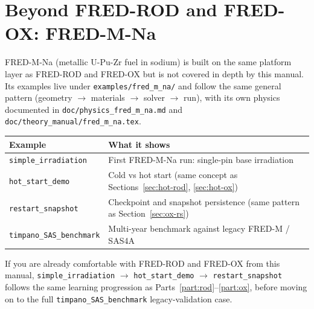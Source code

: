 \documentclass[11pt,a4paper]{article}
\begin{document}
\section{Beyond FRED-ROD and FRED-OX: FRED-M-Na}
\label{sec:mna-pointer}

FRED-M-Na (metallic U-Pu-Zr fuel in sodium) is built on the same platform
layer as FRED-ROD and FRED-OX but is not covered in depth by this manual.
Its examples live under \texttt{examples/fred\_m\_na/} and follow the same
general pattern (geometry $\to$ materials $\to$ solver $\to$ run), with its
own physics documented in \texttt{doc/physics\_fred\_m\_na.md} and
\texttt{doc/theory\_manual/fred\_m\_na.tex}.

\begin{center}
\begin{tabular}{ll}
\toprule
Example & What it shows \\
\midrule
\texttt{simple\_irradiation}         & First FRED-M-Na run: single-pin base irradiation \\
\texttt{hot\_start\_demo}            & Cold vs hot start (same concept as Sections~\ref{sec:hot-rod}, \ref{sec:hot-ox}) \\
\texttt{restart\_snapshot}           & Checkpoint and snapshot persistence (same pattern as Section~\ref{sec:ox-rs}) \\
\texttt{timpano\_SAS\_benchmark}     & Multi-year benchmark against legacy FRED-M / SAS4A \\
\bottomrule
\end{tabular}
\end{center}

\begin{infobox}
  If you are already comfortable with FRED-ROD and FRED-OX from this
  manual, \texttt{simple\_irradiation} $\to$ \texttt{hot\_start\_demo} $\to$
  \texttt{restart\_snapshot} follows the same learning progression as
  Parts~\ref{part:rod}--\ref{part:ox}, before moving on to the full
  \texttt{timpano\_SAS\_benchmark} legacy-validation case.
\end{infobox}

\end{document}
